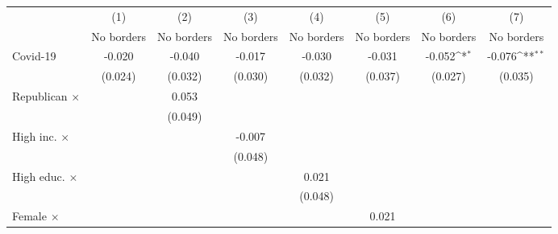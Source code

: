 {
\def\sym#1{\ifmmode^{#1}\else\(^{#1}\)\fi}
\begin{tabular}{l*{7}{c}}
\toprule
                    &\multicolumn{1}{c}{(1)}&\multicolumn{1}{c}{(2)}&\multicolumn{1}{c}{(3)}&\multicolumn{1}{c}{(4)}&\multicolumn{1}{c}{(5)}&\multicolumn{1}{c}{(6)}&\multicolumn{1}{c}{(7)}\\
                    &\multicolumn{1}{c}{No borders}&\multicolumn{1}{c}{No borders}&\multicolumn{1}{c}{No borders}&\multicolumn{1}{c}{No borders}&\multicolumn{1}{c}{No borders}&\multicolumn{1}{c}{No borders}&\multicolumn{1}{c}{No borders}\\
\midrule
Covid-19            &      -0.020         &      -0.040         &      -0.017         &      -0.030         &      -0.031         &      -0.052\sym{*}  &      -0.076\sym{**} \\
                    &     (0.024)         &     (0.032)         &     (0.030)         &     (0.032)         &     (0.037)         &     (0.027)         &     (0.035)         \\
\addlinespace
Republican $\times$ &                     &       0.053         &                     &                     &                     &                     &                     \\
                    &                     &     (0.049)         &                     &                     &                     &                     &                     \\
\addlinespace
High inc. $\times$  &                     &                     &      -0.007         &                     &                     &                     &                     \\
                    &                     &                     &     (0.048)         &                     &                     &                     &                     \\
\addlinespace
High educ. $\times$ &                     &                     &                     &       0.021         &                     &                     &                     \\
                    &                     &                     &                     &     (0.048)         &                     &                     &                     \\
\addlinespace
Female $\times$     &                     &                     &                     &                     &       0.021         &                     &                     \\

\end{tabular}}
